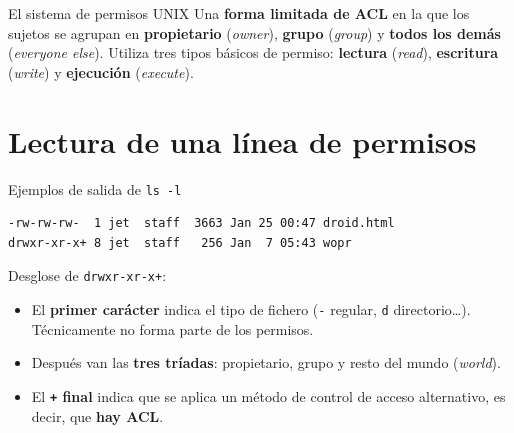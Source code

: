 \documentclass[11pt,a4paper]{report}
\begin{document}
\begin{definicion}{El sistema de permisos UNIX}
Una \textbf{forma limitada de ACL} en la que los sujetos se agrupan en \textbf{propietario} (\emph{owner}), \textbf{grupo} (\emph{group}) y \textbf{todos los demás} (\emph{everyone else}). Utiliza tres tipos básicos de permiso: \textbf{lectura} (\emph{read}), \textbf{escritura} (\emph{write}) y \textbf{ejecución} (\emph{execute}).
\end{definicion}
 
\section{Lectura de una línea de permisos}
 
\begin{ejemplo}{Ejemplos de salida de \texttt{ls -l}}
\begin{verbatim}
-rw-rw-rw-  1 jet  staff  3663 Jan 25 00:47 droid.html
drwxr-xr-x+ 8 jet  staff   256 Jan  7 05:43 wopr
\end{verbatim}
\end{ejemplo}
 
Desglose de \texttt{drwxr-xr-x+}:
 
\begin{center}
\end{center}
 
\begin{itemize}
  \item El \textbf{primer carácter} indica el tipo de fichero (\texttt{-} regular, \texttt{d} directorio\ldots). Técnicamente no forma parte de los permisos.
  \item Después van las \textbf{tres tríadas}: propietario, grupo y resto del mundo (\emph{world}).
  \item El \textbf{\texttt{+} final} indica que se aplica un método de control de acceso alternativo, es decir, que \textbf{hay ACL}.
\end{itemize}
 
\end{document}
